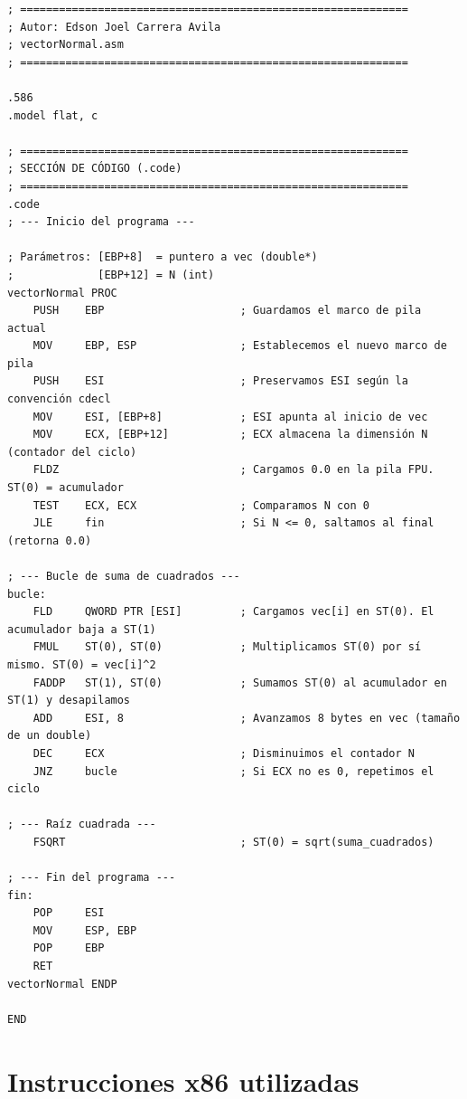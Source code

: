 \documentclass[12pt, letterpaper]{article}
\begin{document}
\begin{lstlisting}[language=MASM, caption={vectorNormal.asm -- Función ensamblador x86}]
; ============================================================
; Autor: Edson Joel Carrera Avila
; vectorNormal.asm
; ============================================================

.586
.model flat, c

; ============================================================
; SECCIÓN DE CÓDIGO (.code)
; ============================================================
.code
; --- Inicio del programa ---

; Parámetros: [EBP+8]  = puntero a vec (double*)
;             [EBP+12] = N (int)
vectorNormal PROC
    PUSH    EBP                     ; Guardamos el marco de pila actual
    MOV     EBP, ESP                ; Establecemos el nuevo marco de pila
    PUSH    ESI                     ; Preservamos ESI según la convención cdecl
    MOV     ESI, [EBP+8]            ; ESI apunta al inicio de vec
    MOV     ECX, [EBP+12]           ; ECX almacena la dimensión N (contador del ciclo)
    FLDZ                            ; Cargamos 0.0 en la pila FPU. ST(0) = acumulador
    TEST    ECX, ECX                ; Comparamos N con 0
    JLE     fin                     ; Si N <= 0, saltamos al final (retorna 0.0)

; --- Bucle de suma de cuadrados ---
bucle:
    FLD     QWORD PTR [ESI]         ; Cargamos vec[i] en ST(0). El acumulador baja a ST(1)
    FMUL    ST(0), ST(0)            ; Multiplicamos ST(0) por sí mismo. ST(0) = vec[i]^2
    FADDP   ST(1), ST(0)            ; Sumamos ST(0) al acumulador en ST(1) y desapilamos
    ADD     ESI, 8                  ; Avanzamos 8 bytes en vec (tamaño de un double)
    DEC     ECX                     ; Disminuimos el contador N
    JNZ     bucle                   ; Si ECX no es 0, repetimos el ciclo

; --- Raíz cuadrada ---
    FSQRT                           ; ST(0) = sqrt(suma_cuadrados)

; --- Fin del programa ---
fin:
    POP     ESI
    MOV     ESP, EBP
    POP     EBP
    RET
vectorNormal ENDP

END
\end{lstlisting}

\section{Instrucciones x86 utilizadas}
\end{document}

